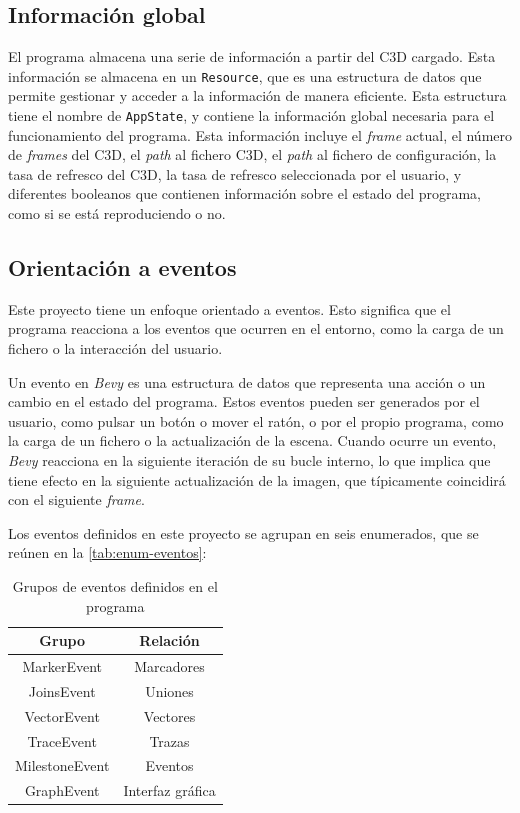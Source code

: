 \subsection{Información global} \label{sec:bevy-global}

El programa almacena una serie de información a partir del \ac{C3D} cargado. Esta información se almacena en un \texttt{Resource}, que es una estructura de datos que permite gestionar y acceder a la información de manera eficiente. Esta estructura tiene el nombre de \texttt{AppState}, y contiene la información global necesaria para el funcionamiento del programa. Esta información incluye el \textit{frame} actual, el número de \textit{frames} del \ac{C3D}, el \textit{path} al fichero \ac{C3D}, el \textit{path} al fichero de configuración, la tasa de refresco del \ac{C3D}, la tasa de refresco seleccionada por el usuario, y diferentes booleanos que contienen información sobre el estado del programa, como si se está reproduciendo o no.


\subsection{Orientación a eventos} \label{sec:bevy-eventos}

Este proyecto tiene un enfoque orientado a eventos. Esto significa que el programa reacciona a los eventos que ocurren en el entorno, como la carga de un fichero o la interacción del usuario. 

Un evento en \textit{Bevy} es una estructura de datos que representa una acción o un cambio en el estado del programa. Estos eventos pueden ser generados por el usuario, como pulsar un botón o mover el ratón, o por el propio programa, como la carga de un fichero o la actualización de la escena. Cuando ocurre un evento, \textit{Bevy} reacciona en la siguiente iteración de su bucle interno, lo que implica que tiene efecto en la siguiente actualización de la imagen, que típicamente coincidirá con el siguiente \textit{frame}.

Los eventos definidos en este proyecto se agrupan en seis enumerados, que se reúnen en la \autoref{tab:enum-eventos}:

\begin{table}[H]
  \centering
  \begin{tabular}{c|c}
  \toprule
  {\textbf{Grupo}} & {\textbf{Relación}} \\
  \midrule
  MarkerEvent & Marcadores \\
  JoinsEvent & Uniones \\
  VectorEvent & Vectores \\
  TraceEvent & Trazas \\
  MilestoneEvent & Eventos \\
  GraphEvent & Interfaz gráfica \\
  \bottomrule
  \end{tabular}
  \caption{Grupos de eventos definidos en el programa}
  \label{tab:enum-eventos}
\end{table}


